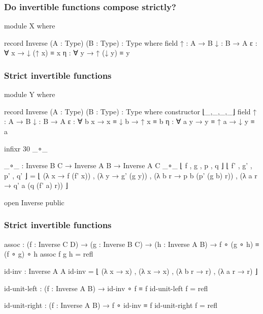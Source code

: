 \documentclass[aspectratio=169,presentation]{beamer}
\begin{document}
\begin{frame}
  \frametitle{Do invertible functions compose strictly?}
  \begin{code}[hide]
    module X where
  \end{code}
  \begin{code}
      record Inverse (A : Type) (B : Type) : Type where
        field
          ↑ : A → B
          ↓ : B → A
          ε : ∀ x  → ↓ (↑ x) ≡ x
          η : ∀ y  → ↑ (↓ y) ≡ y
  \end{code}
\end{frame}

\begin{frame}
  \frametitle{Strict invertible functions}
  \begin{code}[hide]
    module Y where
  \end{code}
  \begin{code}
      record Inverse (A : Type) (B : Type) : Type where
        constructor ⌊_,_,_,_⌋
        field
          ↑ : A → B
          ↓ : B → A
          ε : ∀ b {x}  → x ≡ ↓ b  → ↑ x ≡ b
          η : ∀ a {y}  → y ≡ ↑ a  → ↓ y ≡ a
  \end{code}
  \begin{code}[hide]
      infixr 30 _∘_
  \end{code}
  \begin{code}
      _∘_ : Inverse B C → Inverse A B → Inverse A C
      _∘_ ⌊ f , g , p , q ⌋ ⌊ f' , g' , p' , q' ⌋ =
        ⌊  (λ x → f (f' x)) ,
           (λ y → g' (g y)) ,
           (λ b r → p b (p' (g b) r)) ,
           (λ a r → q' a (q (f' a) r)) ⌋

  \end{code}
  \begin{code}[hide]
      open Inverse public
  \end{code}
\end{frame}

\begin{frame}
  \frametitle{Strict invertible functions}
  \begin{code}
      assoc :  (f : Inverse C D)
            →  (g : Inverse B C)
            →  (h : Inverse A B)
            →  f ∘ (g ∘ h) ≡ (f ∘ g) ∘ h
      assoc f g h = refl

      id-inv : Inverse A A
      id-inv = ⌊  (λ x → x) , (λ x → x) ,
                  (λ b r → r) , (λ a r → r) ⌋

      id-unit-left :  (f : Inverse A B)
                   →  id-inv ∘ f ≡ f
      id-unit-left f = refl

      id-unit-right :  (f : Inverse A B)
                    →  f ∘ id-inv ≡ f
      id-unit-right f = refl
  \end{code}
\end{frame}
\end{document}
